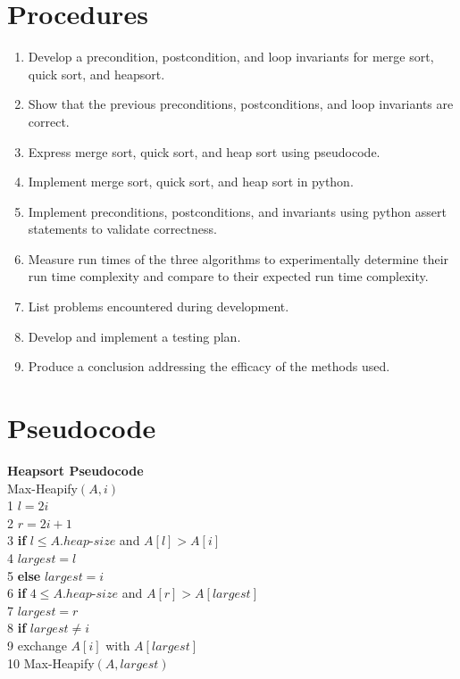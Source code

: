 \documentclass[a4paper]{article}
\begin{document}
    \section{Procedures}
    \begin{enumerate}

        \item Develop a precondition, postcondition, and loop invariants for merge sort,
              quick sort, and heapsort.
        
        \item Show that the previous preconditions, postconditions, and loop invariants
              are correct.
        
        \item Express merge sort, quick sort, and heap sort using pseudocode.

        \item Implement merge sort, quick sort, and heap sort in python.
        
        \item Implement preconditions, postconditions, and invariants using python 
              assert statements to validate correctness.
        
        \item Measure run times of the three algorithms to experimentally determine 
              their run time complexity and compare to their expected run time 
              complexity.
        
        \item List problems encountered during development.
        
        \item Develop and implement a testing plan.

        \item Produce a conclusion addressing the efficacy of the methods used.
    \end{enumerate}

    
    \section{Pseudocode}
    \textbf{Heapsort Pseudocode} \\
    Max-Heapify$(A, i)$ \\ 
    1 $l=2i$ \\
    2 $r=2i+1$ \\
    3 \textbf{if} $l \leq A.heap$-$size$ and $A[l] > A[i]$ \\
    4 \phantom{hell}$largest = l$ \\
    5 \textbf{else} $largest = i$ \\
    6 \textbf{if} $4 \leq A.heap$-$size$ and $A[r] > A[largest]$ \\
    7 \phantom{hell}$largest = r$ \\
    8 \textbf{if} $largest \neq i$ \\
    9 \phantom{hell}exchange $A[i]$ with $A[largest]$ \\
    10 \phantom{he}Max-Heapify$(A, largest)$ \\
\end{document}
